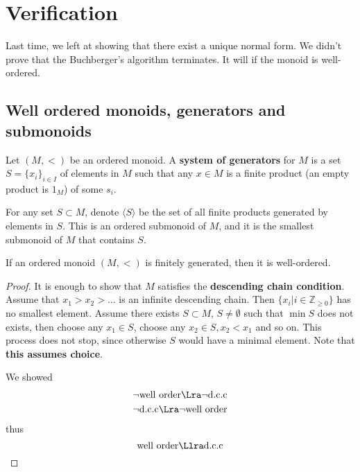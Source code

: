 \section{Verification}

Last time, we left at showing that there exist a unique normal form.
We didn't prove that the Buchberger's algorithm terminates. It will
if the monoid is well-ordered.

\subsection{Well ordered monoids, generators and submonoids}
Let $(M, <)$ be an ordered monoid. A \textbf{system of generators} for $M$
is a set $S = \{x_i\}_{i\in I}$ of elements in $M$ such that 
any $x\in M$ is a finite product (an empty product is $1_M$)
of some $s_i$. 

For any set $S\subset M$, denote $\langle S \rangle$ be the set 
of all finite products generated by elements in $S$. This is 
an ordered submonoid of $M$, and it is the smallest submonoid of $M$
that contains $S$.

\begin{Theorem}
    \label{thm:ordered-monoid}
    If an ordered monoid $(M, <)$ is finitely generated, then it is 
    well-ordered.
\end{Theorem}

\begin{proof}
It is enough to show that $M$ satisfies the \textbf{descending chain condition}.
Assume that $x_1 > x_2 > \ldots$ is an infinite descending chain.
Then $\{x_i| i \in \mathbb{Z}_{\geq 0}\}$ has no smallest element.
Assume there exists $S\subset M$, $S\neq \emptyset$ such that $\min S$ does not exists,
then choose any $x_1 \in S$, choose any $x_2 \in S, x_2 < x_1$ and so on.
This process does not stop, since otherwise $S$ would have a minimal element.
Note that \textbf{this assumes choice}.

We showed 
\begin{eqnarray*}
    \neg\text{well order} \Lra \neg\text{d.c.c} \\
    \neg\text{d.c.c} \Lra \neg\text{well order}
\end{eqnarray*}
thus 
\[\text{well order} \Llra \text{d.c.c}\]
\end{proof}

